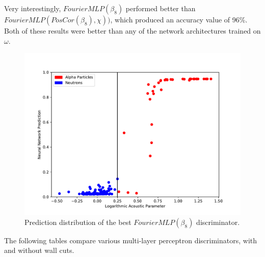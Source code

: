 \documentclass[10pt]{article}
\begin{document}
Very interestingly, $FourierMLP(\beta_{8})$ performed better than $FourierMLP(PosCor(\beta_{8}), \chi))$, which produced an accuracy value of 96\%. Both of these results were better than any of the network architectures trained on $\omega$.

\begin{figure}[H]
    \centering
    \includegraphics[width=\textwidth]{banded_no_pos_input_hist}
    \caption{\label{banded_no_pos_input_hist} Prediction distribution of the best $FourierMLP(\beta_{8})$ discriminator.}
\end{figure}

The following tables compare various multi-layer perceptron discriminators, with and without wall cuts.
\end{document}
